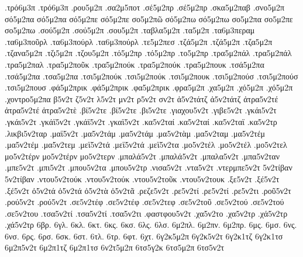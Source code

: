 {.τρό6μ3π  .τρό6μ3π
.ρου5μ2π
.σα2μ5ποτ
.σέ5μ2πρ  .σέ5μ2πρ
.σκα5μ2παβ
.σνο5μ2π
σό5μ2πα  σό5μ2πα
σό5μ2πε  σό5μ2πε
σο5μ2πῶ
σό5μ2πω  σό5μ2πω
σο5μ2πα
σο5μ2πε
σο5μ2πω
.σού5μ2π  .σού5μ2π
.σου5μ2π
.ταβλα5μ2π
.τα5μ2π
.τα6μ3περαμ
.τα6μ3ποῦρλ
.τα6μ3πούρλ  .τα6μ3πούρλ
.τε5μ2πεσ
.τζά5μ2π  .τζά5μ2π
.τζα5μ2π
.τζανα5μ2π
.τζι5μ2π
.τζου5μ2π
.τό5μ2πρ  .τό5μ2πρ
.το5μ2πρ
.τρα5μ2πάλ  .τρα5μ2πάλ
.τρα5μ2παλ
.τρα5μ2ποῦκ
.τρα5μ2πούκ  .τρα5μ2πούκ
.τρα5μ2πουκ
.τσά5μ2πα  .τσά5μ2πα
.τσα5μ2πα
.τσι5μ2πούκ  .τσι5μ2πούκ
.τσι5μ2πουκ
.τσι5μ2πούσ  .τσι5μ2πούσ
.τσι5μ2πουσ
.φά5μ2πρικ  .φά5μ2πρικ
.φα5μ2πρικ
.φρα5μ2π
.χα5μ2π
.χό5μ2π  .χό5μ2π
.χοντρο5μ2πα
β5ν2τ
ζ5ν2τ
λ5ν2τ
μν2τ
ρ5ν2τ
σν2τ
ἀ5ν2τάτζ  ἀ5ν2τάτζ
ἀτρα5ν2τέ  ἀτρα5ν2τέ
ἀτρα5ν2τὲ
.βί5ν2τε  .βί5ν2τε
.βι5ν2τε
.γιαχου5ν2τ
.γιβε5ν2τ
.γκάι5ν2τ  .γκάι5ν2τ
.γκάϊ5ν2τ  .γκάϊ5ν2τ
.γκαϊ5ν2τ
.κα5ν2ταί  .κα5ν2ταί
.κα5ν2ταϊ
.κα5ν2τρ
.λικβι5ν2ταρ
.μαϊ5ν2τ
.μα5ν2τάμ  .μα5ν2τάμ
.μα5ν2τὰμ
.μα5ν2ταμ
.μα5ν2τέμ  .μα5ν2τέμ
.μα5ν2τεμ
.μεϊ5ν2τά  .μεϊ5ν2τά
.μεϊ5ν2τα
.μο5ν2τέλ  .μο5ν2τέλ
.μο5ν2τελ
μο5ν2τέρν  μο5ν2τέρν
μο5ν2τερν
.μπαλά5ν2τ  .μπαλά5ν2τ
.μπαλα5ν2τ
.μπα5ν2ταν
.μπε5ν2τ
.μπι5ν2τ
.μπου5ν2τα
.μπου5ν2τρ
.νισα5ν2τ
.ντα5ν2τ
.ντερμπε5ν2τ
5ν2τίβαν  5ν2τίβαν
.ντου5ν2τούκ  .ντου5ν2τούκ
.ντου5ν2τοῦκ
.ντου5ν2τουκ
.ξε5ν2τ
.ξέ5ν2τ  .ξέ5ν2τ
ὀ5ν2τά  ὀ5ν2τά
ὀ5ν2τὰ
ὀ5ν2τᾶ
.ρεζε5ν2τ
.ρε5ν2τί  .ρε5ν2τί
.ρε5ν2τι
.ροῦ5ν2τ
.ρού5ν2τ  .ρού5ν2τ
.σε5ν2τέφ  .σε5ν2τέφ
.σε5ν2τεφ
.σε5ν2τοῦ
.σε5ν2τού  .σε5ν2τού
.σε5ν2του
.τσα5ν2τί  .τσα5ν2τί
.τσα5ν2τι
.φαστφου5ν2τ
.χα5ν2το
.χα5ν2τρ
.χά5ν2τρ  .χά5ν2τρ
6βρ.
6γλ.
6κλ.
6κτ.
6κς.
6κσ.
6λς.
6λσ.
6μ2πλ.
6μ2πν.
6μ2πρ.
6μς.
6μσ.
6νς.
6νσ.
6ρς.
6ρσ.
6σκ.
6στ.
6τλ.
6τρ.
6φτ.
6χτ.
6γ2κ5μ2π
6γ2κ5ν2τ
6γ2κ1τζ
6γ2κ1τσ
6μ2π5ν2τ
6μ2π1τζ
6μ2π1τσ
6ν2τ5μ2π
6τσ5γ2κ
6τσ5μ2π
6τσ5ν2τ
}
\endgroup
\endinput
